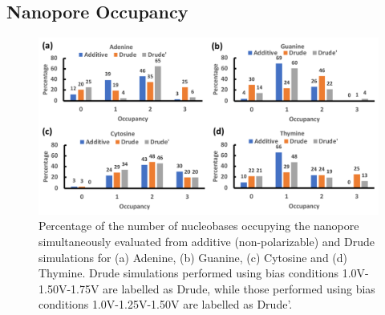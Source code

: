 \subsection[Nanopore Occupancy]{Nanopore Occupancy}
\begin{figure}
    \centering
    \includegraphics[width=\textwidth]{Chapter4/Figures/Figure6.png}
    \caption[Percentage of the number of nucleobases occupying the nanopore simultaneously evaluated from additive (non-polarizable) and Drude simulations for Adenine, Guanine, Cytosine and Thymine.]{Percentage of the number of nucleobases occupying the nanopore simultaneously evaluated from additive (non-polarizable) and Drude simulations for (a) Adenine, (b) Guanine, (c) Cytosine and (d) Thymine. Drude simulations performed using bias conditions 1.0V-1.50V-1.75V are labelled as Drude, while those performed using bias conditions 1.0V-1.25V-1.50V are labelled as Drude'.}
\end{figure}
